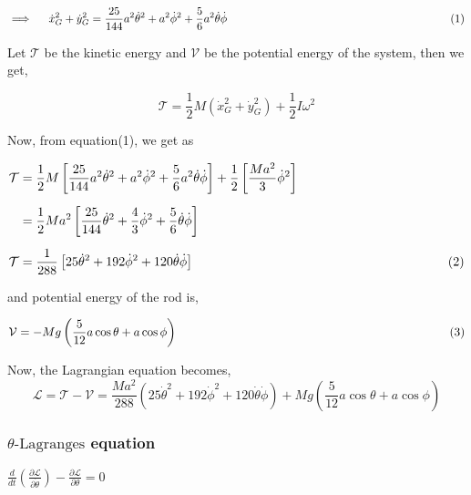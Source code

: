 \documentclass[12pt, a4paper]{article} %
\begin{document}
$\displaystyle \implies \hspace*{4mm} \dot{x}^2_G + \dot{y}^2_G = \frac{25}{144}a^2\dot{\theta}^2 + a^2\dot{\phi}^2 + \frac{5}{6}a^2\dot{\theta}\dot{\phi} \hspace{7cm} (1)$

Let $\mathcal{T}$ be the kinetic energy and $\mathcal{V}$ be the potential energy of the system, then we get, 

\[\mathcal{T} = \frac{1}{2}M\left( \dot{x}^2_G + \dot{y}^2_G\right) + \frac{1}{2}I\omega^2\]

Now, from equation(1), we get as

\begin{equation*}
    \begin{split}
        \mathcal{T} & = \frac{1}{2}M\left[\frac{25}{144}a^2\dot{\theta}^2 + a^2\dot{\phi}^2 + \frac{5}{6}a^2\dot{\theta}\dot{\phi} \right] + \frac{1}{2}\left[\frac{Ma^2}{3} \dot{\phi}^2\right]\\[2mm]
        & = \frac{1}{2}Ma^2\left[\frac{25}{144}\dot{\theta}^2 + \frac{4}{3}\dot{\phi}^2 + \frac{5}{6}\dot{\theta}\dot{\phi}\right]\\[2mm]
        \mathcal{T} & = \frac{1}{288}\left[25\dot{\theta}^2 + 192\dot{\phi}^2 + 120\dot{\theta}\dot{\phi}\right]\hspace*{7cm}(2)
    \end{split}
\end{equation*}
    

and potential energy of the rod is,

\[\mathcal{V} = -Mg\left(\frac{5}{12}a\cos\theta + a\cos\phi\right)\hspace*{8cm}(3)\]

Now, the Lagrangian equation becomes,
\[\mathscr{L} = \mathcal{T - V} = \frac{Ma^2}{288}\left(25\dot{\theta}^2 + 192\dot{\phi}^2 + 120\dot{\theta}\dot{\phi}\right) + Mg\left(\frac{5}{12}a\cos\theta + a\cos\phi\right)\]

\BgThispage

\subsubsection*{$\theta\mbox{-Lagranges}$ equation}

$\displaystyle \frac{d}{dt}\left(\frac{\partial \mathscr{L}}{\partial \dot{\theta}}\right) - \frac{\partial \mathscr{L}}{\partial \theta} = 0$

\vspace*{4mm}
\end{document}
